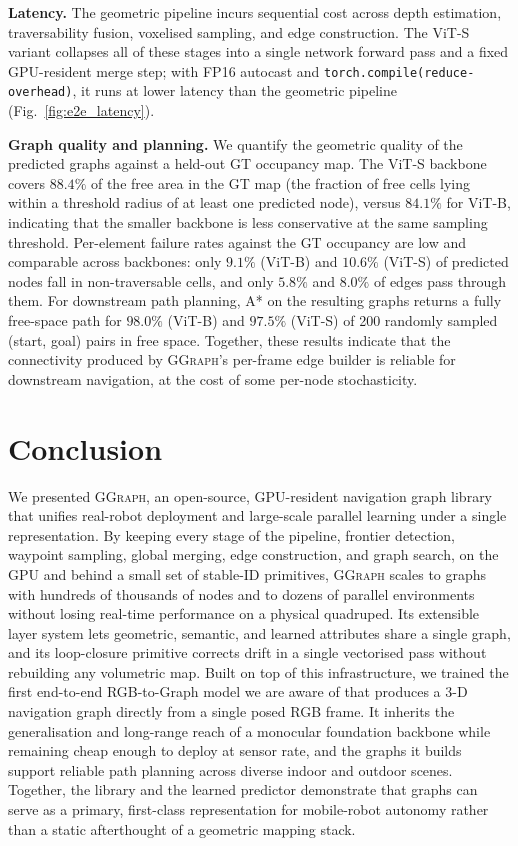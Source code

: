 \documentclass{article}
\newcommand{\sysname}{\textcolor{ggcolor}{\textsc{GGraph}}\xspace}
\begin{document}
\textbf{Latency.}
The geometric pipeline incurs sequential cost across depth estimation,
traversability fusion, voxelised sampling, and edge construction. The
ViT-S variant collapses all of these stages into a single network forward
pass and a fixed GPU-resident merge step; with FP16 autocast and
\texttt{torch.compile(reduce-overhead)}, it runs at lower latency than the
geometric pipeline (Fig.~\ref{fig:e2e_latency}).

\textbf{Graph quality and planning.}
We quantify the geometric quality of the predicted graphs against a
held-out GT occupancy map. The ViT-S backbone covers $88.4\%$ of the
free area in the GT map (the fraction of free cells lying within a
threshold radius of at least one predicted node), versus $84.1\%$ for
ViT-B, indicating that the smaller backbone is less conservative at
the same sampling threshold. Per-element failure rates against the
GT occupancy are low and comparable across backbones: only $9.1\%$
(ViT-B) and $10.6\%$ (ViT-S) of predicted nodes fall in non-traversable
cells, and only $5.8\%$ and $8.0\%$ of edges pass through them. For
downstream path planning, A* on the resulting graphs returns a fully
free-space path for $98.0\%$ (ViT-B) and $97.5\%$ (ViT-S) of 200
randomly sampled (start, goal) pairs in free space. Together, these
results indicate that the connectivity produced by \sysname's
per-frame edge builder is reliable for downstream navigation, at the
cost of some per-node stochasticity.




\section{Conclusion}
\label{sec:conclusion}
We presented \sysname, an open-source, GPU-resident navigation graph
library that unifies real-robot deployment and large-scale parallel
learning under a single representation. By keeping every stage of the
pipeline, frontier detection, waypoint sampling, global merging, edge
construction, and graph search, on the GPU and behind a small set of
stable-ID primitives, \sysname scales to graphs with hundreds of
thousands of nodes and to dozens of parallel environments without
losing real-time performance on a physical quadruped. Its extensible
layer system lets geometric, semantic, and learned attributes share a
single graph, and its loop-closure primitive corrects drift in a
single vectorised pass without rebuilding any volumetric map. Built on
top of this infrastructure, we trained the first end-to-end RGB-to-Graph
model we are aware of that produces a 3-D navigation graph directly
from a single posed RGB frame. It inherits the generalisation and
long-range reach of a monocular foundation backbone while remaining
cheap enough to deploy at sensor rate, and the graphs it builds support
reliable path planning across diverse indoor and outdoor scenes. Together, the library and the learned
predictor demonstrate that graphs can serve as a primary, first-class
representation for mobile-robot autonomy rather than a static
afterthought of a geometric mapping stack.
\end{document}

